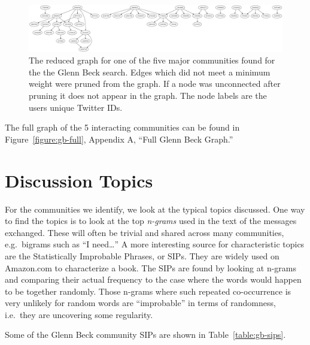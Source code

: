 \documentclass[10pt,oneside]{memoir}
\begin{document}
\begin{figure}
\begin{center}
\includegraphics[width=6in]{figures/gb5-reduced}
\caption{The reduced graph for one of the five major communities found for the the Glenn Beck search.  Edges which did not meet a minimum weight were pruned from the graph.  If a node was unconnected after pruning it does not appear in the graph.  The node labels are the users unique Twitter IDs.}
\label{figure:gb-reduced}
\end{center}
\end{figure}
The full graph of the 5 interacting communities can be found in Figure~\ref{figure:gb-full}, Appendix A, ``Full Glenn Beck Graph.''


\pagebreak \section{Discussion Topics}
\label{discussiontopics}

For the communities we identify, we look at the typical topics discussed. One way to find the topics is to look at the top {\itshape n-grams} \cite{Ngram:Chen-Goodman} used in the text of the messages exchanged. These will often be trivial and shared across many communities, e.g.\ bigrams such as ``I need{\ldots}'' A more interesting source for characteristic topics are the Statistically Improbable Phrases, or SIPs. They are widely used on Amazon.com to characterize a book. The SIPs are found by looking at n-grams and comparing their actual frequency to the case where the words would happen to be together randomly. Those n-grams where such repeated co-occurrence is very unlikely for random words are ``improbable'' in terms of randomness, i.e.\ they are uncovering some regularity.


Some of the Glenn Beck community SIPs are shown in Table~\ref{table:gb-sips}.
\end{document}
